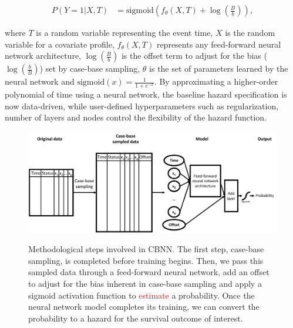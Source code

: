\documentclass[preprint,12pt,authoryear]{elsarticle}
\begin{document}
\begin{align*}
P\left(Y=1|X,T\right)&=\mathrm{sigmoid}\left(f_{\theta}(X, T) + \log\left(\frac{B}{b}\right) \right),
\end{align*}

\noindent where \(T\) is a random variable representing the event time, \(X\) is the random variable for a covariate profile, \(f_{\theta}(X, T)\) represents any feed-forward neural network architecture, \(\log\left(\frac{B}{b}\right)\) is the offset term to adjust for the bias (\(\log\left(\frac{b}{B}\right)\)) set by case-base sampling, \(\theta\) is the set of parameters learned by the neural network and \(\mathrm{sigmoid}(x)=\frac{1}{1+e^{-x}}\). By approximating a higher-order polynomial of time using a neural network, the baseline hazard specification is now data-driven, while user-defined hyperparameters such as regularization, number of layers and nodes control the flexibility of the hazard function.


\begin{figure}

{\centering \includegraphics[width=1\linewidth]{Figure1.pdf}}

\caption{Methodological steps involved in CBNN. The first step, case-base sampling, is completed before training begins. Then, we pass this sampled data through a feed-forward neural network\textcolor{red}{,} add an offset to adjust for the bias inherent in case-base sampling and apply a sigmoid activation function to \textcolor{red}{estimate} a probability. Once the neural network model completes its training, we can convert the probability to a hazard for the survival outcome of interest.}\label{fig:NNarch}
\end{figure}
\end{document}
